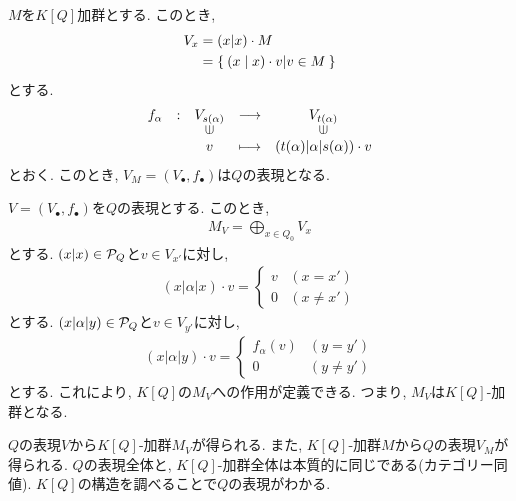 \begin{remark}
$M$を$K[Q]$加群とする.
このとき,
\begin{align*}
  V_x&= (x|x)\cdot M\\
  &=\Set{(x|x)\cdot v | v\in M}
\end{align*}
とする.
\begin{align*}
  \shazo{f_\alpha}
  {V_{s(\alpha)}}{V_{t(\alpha)}}
  {v}{(t(\alpha)|\alpha|s(\alpha))\cdot v}
\end{align*}
とおく.
このとき,
$V_M=(V_\bullet,f_\bullet)$は$Q$の表現となる.
\end{remark}
\begin{remark}
  $V=(V_\bullet,f_\bullet)$を$Q$の表現とする.
  このとき,
  \begin{align*}
    M_{V}=\bigoplus_{x\in Q_0} V_x
  \end{align*}
  とする.
  $(x|x)\in \mathcal{P}_Q$と$v\in V_{x'}$に対し,
  \begin{align*}
    (x|\alpha|x)\cdot v =
    \begin{cases}
      v & (x=x')\\
      0 & (x\neq x')
    \end{cases}
  \end{align*}
  とする.
  $(x|\alpha|y)\in \mathcal{P}_Q$と$v\in V_{y'}$に対し,
  \begin{align*}
    (x|\alpha|y)\cdot v =
    \begin{cases}
      f_\alpha(v) & (y=y')\\
      0 & (y\neq y')
    \end{cases}
  \end{align*}
  とする.
  これにより, $K[Q]$の$M_V$への作用が定義できる.
  つまり, $M_V$は$K[Q]$-加群となる.
\end{remark}
\begin{remark}
  $Q$の表現$V$から$K[Q]$-加群$M_V$が得られる.
  また,
  $K[Q]$-加群$M$から$Q$の表現$V_M$が得られる.
  $Q$の表現全体と,
  $K[Q]$-加群全体は本質的に同じである(カテゴリー同値).
  $K[Q]$の構造を調べることで$Q$の表現がわかる.
\end{remark}

\section{}




